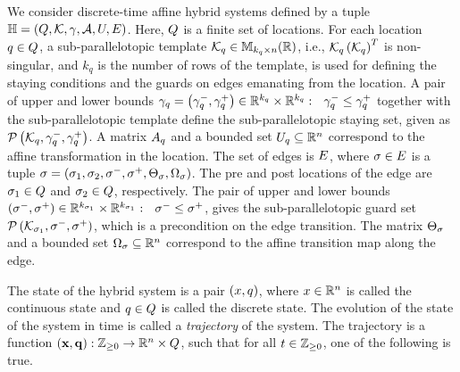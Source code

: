 

We consider discrete-time affine hybrid systems defined by a tuple $\mathbb{H} =
\left(Q,\mathcal{K},\gamma,\mathcal{A},U,E\right)$. Here, $Q$ is a finite set of locations.  For each location
$q\in Q$, a sub-parallelotopic template
$\mathcal{K}_q\in\mathbb{M}_{k_q\times n}(\mathbb{\mathbb{R}})$, i.e.,
$\mathcal{K}_q\left(\mathcal{K}_q\right)^T$ is non-singular, and $k_q$
is the number of rows of the template, is used for defining the
staying conditions and the guards on edges emanating from the
location.  A pair of upper and lower bounds
$\gamma_q=\left(\gamma^-_q,\gamma^+_q\right)\in\mathbb{R}^{k_q}\times\mathbb{R}^{k_q}:
~~\gamma^-_q\leq\gamma^+_q$ together with the sub-parallelotopic
template define the sub-parallelotopic staying set, given as
$\mathcal{P}\left(\mathcal{K}_q,\gamma^-_q,\gamma^+_q\right)$.  A matrix
$A_q$ and a bounded set $U_q\subseteq\mathbb{R}^n$ correspond
to the affine transformation in the location.  The set of edges is
$E$, where $\sigma\in E$ is a tuple $\sigma
= \left(\sigma_{1},\sigma_{2},\sigma^-,\sigma^+,\Theta_\sigma,\Omega_\sigma\right)$.
The pre and post locations of the edge are
$\sigma_{1}\in Q$ and $\sigma_{2}\in Q$,
respectively.  The pair of upper and lower bounds
$\left(\sigma^-,\sigma^+\right)\in\mathbb{R}^{k_{\sigma_{1}}}\times\mathbb{R}^{k_{\sigma_{1}}}:~~\sigma^-\leq\sigma^+$,
gives the sub-parallelotopic guard set
$\mathcal{P}\left(\mathcal{K}_{\sigma_{1}},\sigma^-,\sigma^+\right)$, which is a
precondition on the edge transition.  The matrix $\Theta_\sigma$ and
a bounded set $\Omega_\sigma\subseteq\mathbb{R}^n$ correspond to the
affine transition map along the edge.

The state of the hybrid system is a pair $(x,q)$, where
$x\in\mathbb{R}^n$ is called the continuous state and
$q\in Q$ is called the discrete state.  The
evolution of the state of the system in time is called a
\emph{trajectory} of the system.  The trajectory is a function
$\left({\bf x},{\bf q}\right):\mathbb{Z}_{\geq 0}\rightarrow\mathbb{R}^n\times Q$, such
that for all $t\in\mathbb{Z}_{\geq 0}$, one of the following is true.

